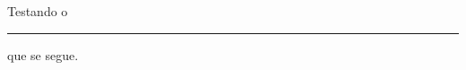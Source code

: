 \documentclass[a4paper]{article}
\begin{document}
Testando o \rule{10mm}{3mm} que se segue.
\end{document}
